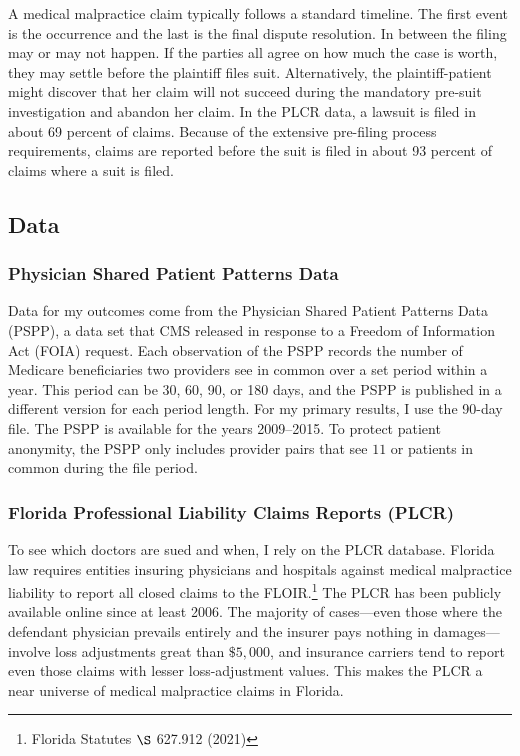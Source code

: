 \documentclass[
  12pt,
]{article}
\begin{document}
A medical malpractice claim typically follows a standard timeline. The first event is the occurrence and the last is the final dispute resolution. In between the filing may or may not happen. If the parties all agree on how much the case is worth, they may settle before the plaintiff files suit. Alternatively, the plaintiff-patient might discover that her claim will not succeed during the mandatory pre-suit investigation and abandon her claim. In the PLCR data, a lawsuit is filed in about 69 percent of claims. Because of the extensive pre-filing process requirements, claims are reported before the suit is filed in about 93 percent of claims where a suit is filed.

\hypertarget{data}{%
\subsection{Data}\label{data}}

\hypertarget{physician-shared-patient-patterns-data}{%
\subsubsection{Physician Shared Patient Patterns Data}\label{physician-shared-patient-patterns-data}}

Data for my outcomes come from the Physician Shared Patient Patterns Data (PSPP), a data set that CMS released in response to a Freedom of Information Act (FOIA) request. Each observation of the PSPP records the number of Medicare beneficiaries two providers see in common over a set period within a year. This period can be 30, 60, 90, or 180 days, and the PSPP is published in a different version for each period length. For my primary results, I use the 90-day file. The PSPP is available for the years 2009--2015. To protect patient anonymity, the PSPP only includes provider pairs that see \(11\) or patients in common during the file period.

\hypertarget{florida-professional-liability-claims-reports-plcr}{%
\subsubsection{Florida Professional Liability Claims Reports (PLCR)}\label{florida-professional-liability-claims-reports-plcr}}

To see which doctors are sued and when, I rely on the PLCR database. Florida law requires entities insuring physicians and hospitals against medical malpractice liability to report all closed claims to the FLOIR.\footnote{Florida Statutes \(\S\) 627.912 (2021)} The PLCR has been publicly available online since at least 2006. The majority of cases---even those where the defendant physician prevails entirely and the insurer pays nothing in damages---involve loss adjustments great than \(\$5,000\), and insurance carriers tend to report even those claims with lesser loss-adjustment values. This makes the PLCR a near universe of medical malpractice claims in Florida.
\end{document}
